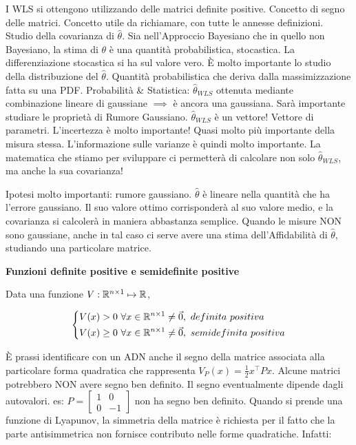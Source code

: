I WLS si ottengono utilizzando delle matrici definite positive. Concetto di segno delle matrici. Concetto utile da richiamare, con tutte le annesse definizioni. Studio della covarianza di $\hat{\theta}$. Sia nell'Approccio Bayesiano che in quello non Bayesiano, la stima di $\theta$ è una quantità probabilistica, stocastica. La differenziazione stocastica si ha sul valore vero. \`E molto importante lo studio della distribuzione del $\hat{\theta}$. Quantità probabilistica che deriva dalla massimizzazione fatta su una PDF. Probabilità \& Statistica: $\hat{\theta}_{WLS}$ ottenuta mediante combinazione lineare di gaussiane $\implies$ è ancora una gaussiana. Sarà importante studiare le proprietà di Rumore Gaussiano. $\hat{\theta}_{WLS}$ è un vettore! Vettore di parametri. L'incertezza è molto importante! Quasi molto più importante della misura stessa. L'informazione sulle varianze è quindi molto importante. La matematica che stiamo per sviluppare ci permetterà di calcolare non solo $\hat{\theta}_{WLS}$, ma anche la sua covarianza!

Ipotesi molto importanti: rumore gaussiano. $\hat{\theta}$ è lineare nella quantità che ha l'errore gaussiano. Il suo valore ottimo corrisponderà al suo valore medio, e la covarianza si calcolerà in maniera abbastanza semplice. Quando le misure NON sono gaussiane, anche in tal caso ci serve avere una stima dell'Affidabilità di $\hat{\theta}$, studiando una particolare matrice.


\begin{defn}{\textbf{Funzioni definite positive e semidefinite positive}}

Data una funzione $V:\mathbb{R}^{n\times 1}\mapsto \mathbb{R}$, 

\[
	\left\{
	\begin{aligned}
	&V(x)>0\ \forall x\in\R^{n\times 1}\neq\vec{0},\ definita\ positiva\\
	&V(x)\geq 0\ \forall x\in\R^{n\times 1}\neq\vec{0},\ semidefinita\ positiva
	\end{aligned}
	\right.
\]

\end{defn}

\`E prassi identificare con un ADN anche il segno della matrice associata alla particolare forma quadratica che rappresenta $V_P(x) = \frac{1}{2}x^\top Px$. Alcune matrici potrebbero NON avere segno ben definito. Il segno eventualmente dipende dagli autovalori. es: $P=\begin{bmatrix}1&0\\0&-1\end{bmatrix}$ non ha segno ben definito. Quando si prende una funzione di Lyapunov, la simmetria della matrice è richiesta per il fatto che la parte antisimmetrica non fornisce contributo nelle forme quadratiche. Infatti:


